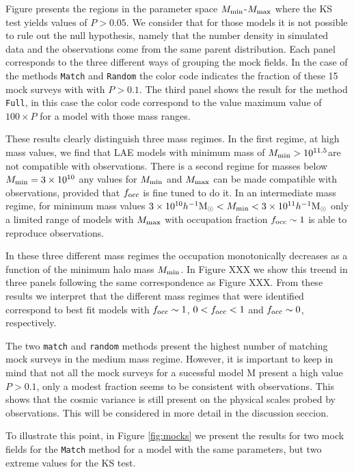 \documentclass[usenatbib]{mn2e}
\newcommand{\hMsun}{{\ifmmode{h^{-1}{\rm {M_{\odot}}}}\else{$h^{-1}{\rm{M_{\odot}}}$}\fi}}
\begin{document}
Figure \label{figure:landscape} presents the regions in the parameter
space $M_{\rm min}$-$M_{\rm max}$ where the KS test yields values of
$P>0.05$. We consider that for those models it is not possible to rule out the null
hypothesis, namely that the number density in simulated data and the observations come
from the same parent distribution. Each panel corresponds to the three different ways of
grouping the mock fields. In the case of the methods {\tt{Match}}
and {\tt{Random}} the color code indicates the fraction of these 15
mock surveys with with $P>0.1$. The third panel shows the result for
the method {\tt{Full}}, in this case the color code correspond
to the value maximum value of $100\times P$ for a model with those
mass ranges.

These results clearly distinguish three mass regimes. In the first regime, at
high mass values, we find that LAE models with minimum mass of $M_{\rm
  min}>10^{11.5}$\hMsun are not compatible with observations. There is
a second regime for masses below $M_{\rm
  min}=3\times 10^{10}$ any values for $M_{\rm min}$ and $M_{\rm max}$
can be made compatible with observations, provided that
$f_{\rm occ}$ is fine tuned to do it. In an intermediate mass regime,
for minimum mass values $3\times 10^{10}\hMsun < M_{\rm min}< 3\times 10^{11}\hMsun$ only a
limited range of models with $M_{\rm max}$ with occupation fraction
$f_{\rm occ}\sim 1$ is able to reproduce observations. 

In these three different mass regimes the occupation monotonically
decreases as a function of the minimum halo mass $M_{\rm min}$. In
Figure XXX we show this treend in three panels following the same
correspondence as Figure XXX. From these results we interpret that the
different mass regimes that were identified correspond to best fit
models with $f_{\rm occ}\sim 1$, $0<f_{\rm occ}<1$ and $f_{\rm
  occ}\sim 0$, respectively. 

The two {\tt match} and {\tt random} methods present the highest
number of matching mock surveys in the medium mass regime. However, it
is important to keep in mind that not all the mock surveys for a
sucessful model ${\mathrm M}$ present a high value $P>0.1$, only a
modest fraction seems to be consistent with observations. This shows that the
cosmic variance is still present on the physical scales probed by
observations. This will be considered in more detail in the discussion
seccion. 

To illustrate this point, in Figure \ref{fig:mocks} we present the
results for two mock fields for the {\tt{Match}} method for a model
with the same parameters, but two extreme values for the KS test. 
\end{document}
